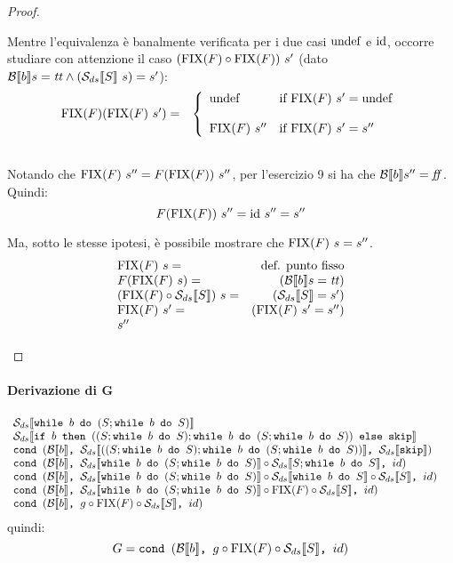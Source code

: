 {\begin{proof}
\begin{itemize}
        Mentre l'equivalenza è banalmente verificata per i due casi $\undefDS$
        e $\idDS$, occorre studiare con attenzione il caso
        $(\fixp{F} \circ \fixp{F})\ s'$ (dato
        $\B{b} = \semtrue \land (\dsCtxt{S}\ s) = s'$):
        $$
        \begin{array}{ll}
        \fixp{F} (\fixp{F}\ s') =
        & \caseFun{\undefDS}
                  {\fixp{F}\ s' = \undefDS}
                  {\fixp{F}\ s''}
                  {\fixp{F}\ s' = s''}  \\
        \\
        \end{array}
        $$

        Notando che $\fixp{F}\ s'' = F(\fixp{F})\ s''$, per l'esercizio 9 si
        ha che $\B{b}'' = \semfalse$. Quindi:
        $$
        F(\fixp{F})\ s'' = \idDS{}\ s'' = s''
        $$

        Ma, sotto le stesse ipotesi, è possibile mostrare che
        $\fixp{F}\ s  =s''$.
        $$
        \begin{array}{lr}
        \fixp{F}\ s = & \text{def. punto fisso} \\
        F(\fixp{F}\ s) = & (\B{b} = \semtrue) \\
        (\fixp{F} \circ \dsCtxt{S})\ s = & (\dsCtxt{S} = s') \\
        \fixp{F} \ s' = & (\fixp{F}\ s' = s'') \\
        s''
        \end{array}
        $$
\end{itemize}

\end{proof}
\paragraph{Derivazione di G}
$$
\begin{array}{ll}
\dsCtxt{\wbS{b}{(S; \wbS{b}{S})}} & \\
\dsCtxt{\ifABC{b}{((S; \wbS{b}{S}); \wbS{b}{(S; \wbS{b}{S})})}{\skipForFriends}} & \\
\cond{b}{\dsCtxt{((S; \wbS{b}{S}); \wbS{b}{(S; \wbS{b}{S})})}}{\dsCtxt{\skipForFriends}}\\
\cond{b}{\dsCtxt{\wbS{b}{(S; \wbS{b}{S})}} \circ \dsCtxt{S; \wbS{b}{S}}}{id} & \\
\cond{b}{\dsCtxt{\wbS{b}{(S; \wbS{b}{S})}} \circ \dsCtxt{\wbS{b}{S}} \circ \dsCtxt{S}}{id} & \\
\cond{b}{\dsCtxt{\wbS{b}{(S; \wbS{b}{S})}} \circ \fixp{F} \circ \dsCtxt{S}}{id} & \\
\cond{b}{g \circ \fixp{F} \circ \dsCtxt{S}}{id} & \\
\end{array}
$$
quindi:
$$
G = \cond{b}{g \circ \fixp{F} \circ \dsCtxt{S}}{id}
$$
}
